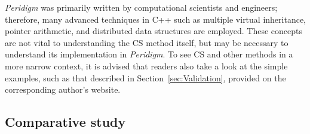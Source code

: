 \documentclass[preprint,12pt]{elsarticle}
\begin{document}
\emph{Peridigm} was primarily written by computational scientists and engineers; therefore, many advanced techniques in C++ such as multiple virtual inheritance, pointer arithmetic, and distributed data structures are employed. These concepts are not vital to understanding the CS method itself, but may be necessary to understand its implementation in \emph{Peridigm}. To see CS and other methods in a more narrow context, it is advised that readers also take a look at the simple examples, such as that described in Section~\ref{sec:Validation},  provided on the corresponding author's website.

\subsection{Comparative study} 
\label{tcs}
\end{document}
